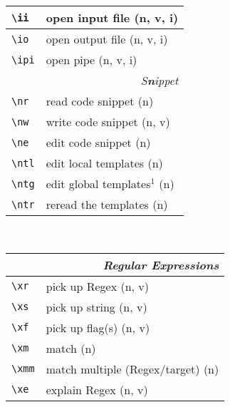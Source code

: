 \documentclass[oneside,10pt,landscape,DIV17]{scrartcl}
\begin{document}
\begin{multicols}{3}
\begin{center}
\begin{tabular}[]{|p{18mm}|p{49mm}|}
\hline \verb'\ii'  & open input file           \hfill (n, v, i)\\
\hline \verb'\io'  & open output file          \hfill (n, v, i)\\
\hline \verb'\ipi' & open pipe                 \hfill (n, v, i)\\
\hline
\hline
\multicolumn{2}{|r|}{\textsl{S\textbf{n}ippet}}             \\[1.0ex]
\hline \verb'\nr'  & read code snippet         \hfill (n)   \\
\hline \verb'\nw'  & write code snippet        \hfill (n, v)\\
\hline \verb'\ne'  & edit code snippet         \hfill (n)   \\
%
\hline \verb'\ntl' & edit local templates      \hfill (n)   \\
\hline \verb'\ntg' & edit global templates$^1$ \hfill (n)   \\
\hline \verb'\ntr' & reread the templates      \hfill (n)   \\
\hline
\end{tabular}\\
%
%
\begin{tabular}[]{|p{11mm}|p{58mm}|}
\hline
\multicolumn{2}{|r|}{\textsl{Regular E\textbf{x}pressions}}     \\[1.0ex]
\hline \verb'\xr' &  pick up Regex                 \hfill (n, v)\\
\hline \verb'\xs' &  pick up string                \hfill (n, v)\\
\hline \verb'\xf' &  pick up flag(s)               \hfill (n, v)\\
\hline \verb'\xm' &  match                         \hfill (n)   \\
\hline \verb'\xmm'&  match multiple (Regex/target) \hfill (n)   \\
\hline \verb'\xe' &  explain Regex                 \hfill (n, v)\\
\hline

\end{tabular}
\end{center}
\end{multicols}
\end{document}
